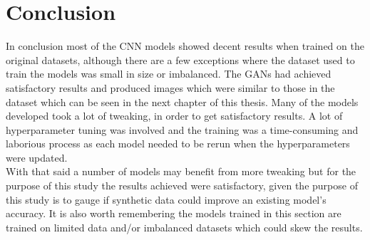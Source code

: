 \section{Conclusion}
In conclusion most of the CNN models showed decent results when trained on the original datasets, although there are a few exceptions where the dataset used to train the models was small in size or imbalanced.  The GANs had achieved satisfactory results and produced images which were similar to those in the dataset which can be seen in the next chapter of this thesis.  Many of the models developed took a lot of tweaking, in order to get satisfactory results.  A lot of hyperparameter tuning was involved and the training was a time-consuming and laborious process as each model needed to be rerun when the hyperparameters were updated.
\\
With that said a number of models may benefit from more tweaking but for the purpose of this study the results achieved were satisfactory, given the purpose of this study is to gauge if synthetic data could improve an existing model's accuracy.  It is also worth remembering the models trained in this section are trained on limited data and/or imbalanced datasets which could skew the results. 

